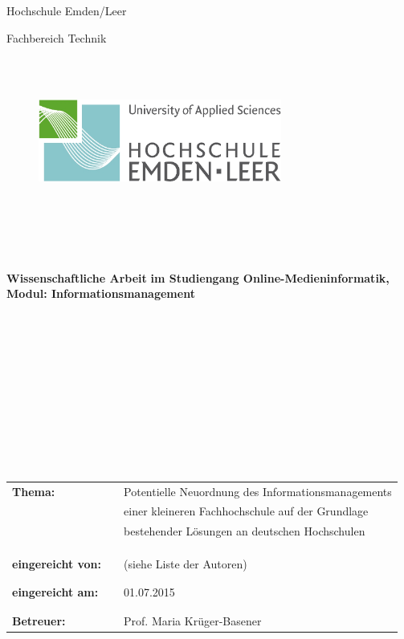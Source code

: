 	\thispagestyle{empty}
	\begin{center}
		\Large{Hochschule Emden/Leer}\\
	\end{center}
	
	
	\begin{center}
		\Large{Fachbereich Technik}
	\end{center}
	\begin{verbatim}
	
	
	\end{verbatim}
	
	\begin{figure}[h!]
	    \centering
		\includegraphics[width=8cm]{struktur/grafiken/fb_technik_logo}
	\end{figure}
	
	\begin{verbatim}
	
	
	
	
	\end{verbatim}
	
	
	\begin{center}
		\textbf{Wissenschaftliche Arbeit}
		\textbf{im Studiengang Online-Medieninformatik,\\}
		\textbf{Modul: Informationsmanagement}
	\end{center}
	\begin{verbatim}
	
	
	
	
	
	
	
	
	
	
	\end{verbatim}
	
	\begin{flushleft}
		\begin{tabular}{lll}
			\textbf{Thema:} & & Potentielle Neuordnung des Informationsmanagements  \\ 
			& & einer kleineren Fachhochschule auf der Grundlage \\
			& & bestehender Lösungen an deutschen Hochschulen\\
			& & \\
			& & \\
			& & \\
			\textbf{eingereicht von:} & & (siehe Liste der Autoren)\\
			& & \\
			& & \\
			\textbf{eingereicht am:} & & 01.07.2015\\
			& & \\
			& & \\
			\textbf{Betreuer:} & & Prof. Maria Krüger-Basener
		\end{tabular}
	\end{flushleft}
	
	\newpage
